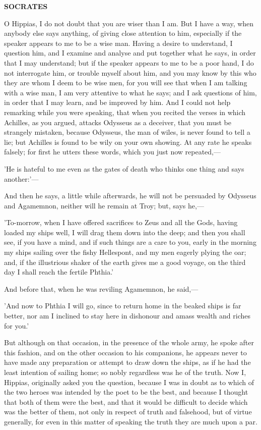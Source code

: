 \documentclass[11pt,letter]{article}
\begin{document}
\par \textbf{SOCRATES}
\par   O Hippias, I do not doubt that you are wiser than I am. But I have a way, when anybody else says anything, of giving close attention to him, especially if the speaker appears to me to be a wise man. Having a desire to understand, I question him, and I examine and analyse and put together what he says, in order that I may understand; but if the speaker appears to me to be a poor hand, I do not interrogate him, or trouble myself about him, and you may know by this who they are whom I deem to be wise men, for you will see that when I am talking with a wise man, I am very attentive to what he says; and I ask questions of him, in order that I may learn, and be improved by him. And I could not help remarking while you were speaking, that when you recited the verses in which Achilles, as you argued, attacks Odysseus as a deceiver, that you must be strangely mistaken, because Odysseus, the man of wiles, is never found to tell a lie; but Achilles is found to be wily on your own showing. At any rate he speaks falsely; for first he utters these words, which you just now repeated,—

\par  'He is hateful to me even as the gates of death who thinks one thing and says another:'—

\par  And then he says, a little while afterwards, he will not be persuaded by Odysseus and Agamemnon, neither will he remain at Troy; but, says he,—

\par  'To-morrow, when I have offered sacrifices to Zeus and all the Gods, having loaded my ships well, I will drag them down into the deep; and then you shall see, if you have a mind, and if such things are a care to you, early in the morning my ships sailing over the fishy Hellespont, and my men eagerly plying the oar; and, if the illustrious shaker of the earth gives me a good voyage, on the third day I shall reach the fertile Phthia.'

\par  And before that, when he was reviling Agamemnon, he said,—

\par  'And now to Phthia I will go, since to return home in the beaked ships is far better, nor am I inclined to stay here in dishonour and amass wealth and riches for you.'

\par  But although on that occasion, in the presence of the whole army, he spoke after this fashion, and on the other occasion to his companions, he appears never to have made any preparation or attempt to draw down the ships, as if he had the least intention of sailing home; so nobly regardless was he of the truth. Now I, Hippias, originally asked you the question, because I was in doubt as to which of the two heroes was intended by the poet to be the best, and because I thought that both of them were the best, and that it would be difficult to decide which was the better of them, not only in respect of truth and falsehood, but of virtue generally, for even in this matter of speaking the truth they are much upon a par.
\end{document}
